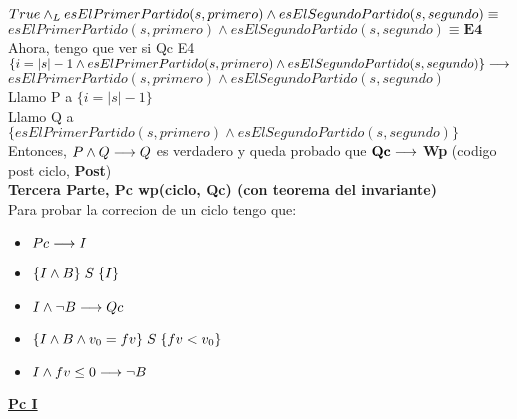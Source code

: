 \documentclass[10pt,a4paper]{article}
\begin{document}
\begin{enumerate}
\vspace{0.3cm}
\\
$True \land _L esElPrimerPartido(s, primero) \land esElSegundoPartido(s, segundo)\equiv$
\vspace{0.3cm}
\\
$esElPrimerPartido(s, primero) \land esElSegundoPartido(s, segundo)\equiv \textbf{E4}$
\vspace{0.3cm}
\\
Ahora, tengo que ver si Qc \implica E4
\vspace{0.3cm}
\\
$\{i= \vert s \vert -1 \land esElPrimerPartido(s, primero) \land esElSegundoPartido(s, segundo)\} \longrightarrow$
\vspace{0.3cm}
\\
$esElPrimerPartido(s, primero) \land esElSegundoPartido(s, segundo)$
\vspace{0.3cm}
\\
Llamo P a $\{i = \vert s \vert -1\}$ 
\vspace{0.3cm}
\\
Llamo Q a $\{esElPrimerPartido(s, primero) \land esElSegundoPartido(s, segundo)\}$
\vspace{0.3cm}
\\
Entonces, $P \land Q \longrightarrow Q$ es verdadero y queda probado que $\textbf{Qc} \longrightarrow$ \textbf{Wp} (codigo post ciclo, \textbf{Post})
\vspace{0.3cm}
\\
\textbf{Tercera Parte, Pc \implica wp(ciclo, Qc) (con teorema del invariante)}
\vspace{0.3cm}
\\
Para probar la correcion de un ciclo tengo que:
\begin{itemize}
    \item $Pc \longrightarrow I$
    \item $\{I\land B\}\hspace{0.1cm}S\hspace{0.1cm}\{I\}$
    \item $I \land \neg B \longrightarrow Qc$
    \item $\{I\land B\land v_0=fv\}\hspace{0.1cm}S\hspace{0.1cm}\{fv<v_0\}$
    \item $I \land fv\leq0 \longrightarrow \neg B$
\end{itemize}
\underline{\textbf{Pc \implica I}}
\vspace{0.3cm}
\\

\end{enumerate}
\end{document}
